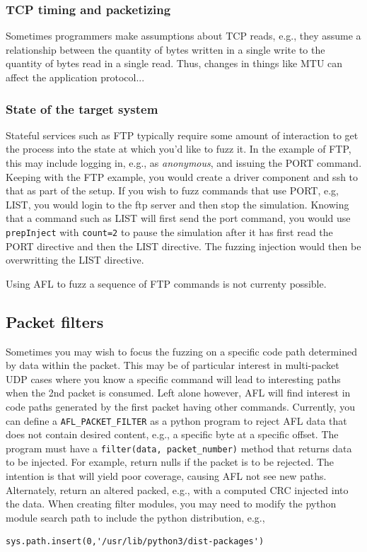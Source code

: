\documentclass[titlepage]{article}
\begin{document}
\subsubsection{TCP timing and packetizing}
Sometimes programmers make assumptions about TCP reads, e.g., they assume a relationship between the quantity of bytes written in a single write to the
quantity of bytes read in a single read.  Thus, changes in things like MTU can affect the application protocol...

\subsubsection{State of the target system}
Stateful services such as FTP typically require some amount of interaction to get the process into the state at which you'd like to fuzz it.
In the example of FTP, this may include logging in, e.g., as \textit{anonymous}, and issuing the PORT command.  Keeping with the FTP example,
you would create a driver component and ssh to that as part of the setup.  If you wish to fuzz commands that use PORT, e.g, LIST, you would
login to the ftp server and then stop the simulation.  Knowing that a command such as LIST will first send the port command, you would use
{\tt prepInject} with {\tt count=2} to pause the simulation after it has first read the PORT directive and then the LIST directive.  The fuzzing
injection would then be overwritting the LIST directive.

Using AFL to fuzz a sequence of FTP commands is not currenty possible.


\subsection{Packet filters}
Sometimes you may wish to focus the fuzzing on a specific code path determined by data within the packet.  This may be of particular
interest in multi-packet UDP cases where you know a specific command will lead to interesting paths when the 2nd packet is consumed.
Left alone however, AFL will find interest in code paths generated by the first packet having other commands.  Currently, you can
define a {\tt AFL\_PACKET\_FILTER} as a python program to reject AFL data that does not contain desired content, e.g., a specific byte
at a specific offset.  The program must have a {\tt filter(data, packet\_number)} method that returns data to be injected.  
For example, return nulls if the packet is to be rejected.  The intention is that will yield poor coverage, causing AFL not see new paths.
Alternately, return an altered packed, e.g., with a computed CRC injected into the data.
When creating filter modules, you may need to modify the python module search path to include the python distribution, e.g., 
\begin{verbatim}
sys.path.insert(0,'/usr/lib/python3/dist-packages')
\end{verbatim}
\end{document}
